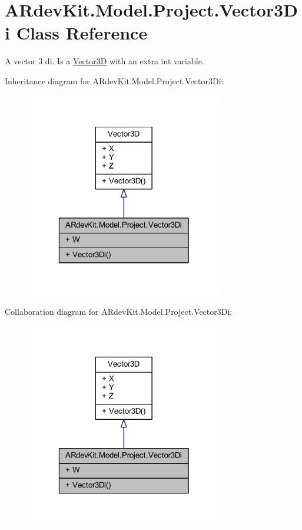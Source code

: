 \hypertarget{class_a_rdev_kit_1_1_model_1_1_project_1_1_vector3_di}{\section{A\-Rdev\-Kit.\-Model.\-Project.\-Vector3\-Di Class Reference}
\label{class_a_rdev_kit_1_1_model_1_1_project_1_1_vector3_di}
}


A vector 3 di. Is a \hyperlink{class_a_rdev_kit_1_1_model_1_1_project_1_1_vector3_d}{Vector3\-D} with an extra int variable.  




Inheritance diagram for A\-Rdev\-Kit.\-Model.\-Project.\-Vector3\-Di\-:
\nopagebreak
\begin{figure}[H]
\begin{center}
\leavevmode
\includegraphics[width=244pt]{class_a_rdev_kit_1_1_model_1_1_project_1_1_vector3_di__inherit__graph}
\end{center}
\end{figure}


Collaboration diagram for A\-Rdev\-Kit.\-Model.\-Project.\-Vector3\-Di\-:
\nopagebreak
\begin{figure}[H]
\begin{center}
\leavevmode
\includegraphics[width=244pt]{class_a_rdev_kit_1_1_model_1_1_project_1_1_vector3_di__coll__graph}
\end{center}
\end{figure}
